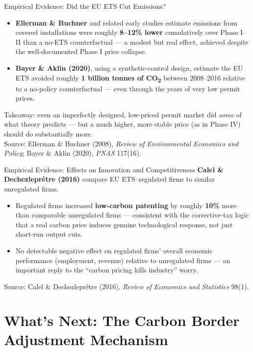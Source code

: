 \documentclass[11pt,aspectratio=169]{beamer}
\newcommand{\srcnote}[1]{{\footnotesize\color{wugray}Source: #1}}
\begin{document}
\begin{frame}{Empirical Evidence: Did the EU ETS Cut Emissions?}
  \begin{itemize}
    \item \textbf{Ellerman \& Buchner} and related early studies estimate emissions from covered installations were roughly \textbf{8--12\% lower} cumulatively over Phase I--II than a no-ETS counterfactual --- a modest but real effect, achieved despite the well-documented Phase I price collapse.
    \item \textbf{Bayer \& Aklin (2020)}, using a synthetic-control design, estimate the EU ETS avoided roughly \textbf{1 billion tonnes of CO\textsubscript{2}} between 2008--2016 relative to a no-policy counterfactual --- even through the years of very low permit prices.
  \end{itemize}
  \small Takeaway: even an imperfectly designed, low-priced permit market did \emph{some} of what theory predicts --- but a much higher, more stable price (as in Phase IV) should do substantially more.\\
  \srcnote{Ellerman \& Buchner (2008), \emph{Review of Environmental Economics and Policy}; Bayer \& Aklin (2020), \emph{PNAS} 117(16).}
\end{frame}

\begin{frame}{Empirical Evidence: Effects on Innovation and Competitiveness}
  \textbf{Calel \& Dechezleprêtre (2016)} compare EU ETS--regulated firms to similar unregulated firms.
  \begin{itemize}
    \item Regulated firms increased \textbf{low-carbon patenting} by roughly \textbf{10\%} more than comparable unregulated firms --- consistent with the corrective-tax logic that a real carbon price induces genuine technological response, not just short-run output cuts.
    \item No detectable negative effect on regulated firms' overall economic performance (employment, revenue) relative to unregulated firms --- an important reply to the ``carbon pricing kills industry'' worry.
  \end{itemize}
  \srcnote{Calel \& Dechezleprêtre (2016), \emph{Review of Economics and Statistics} 98(1).}
\end{frame}

\section{What's Next: The Carbon Border Adjustment Mechanism}
\end{document}
